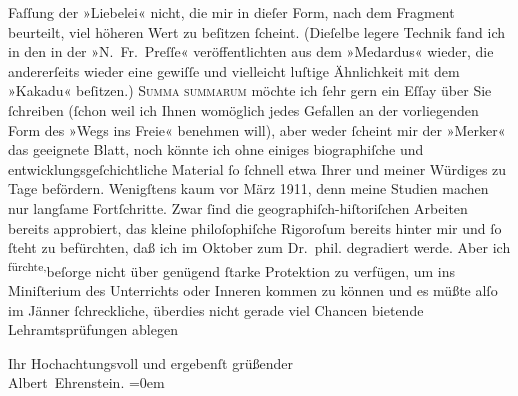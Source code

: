                Faſſung der »Liebelei« nicht, die mir in dieſer
               Form, nach dem Fragment beurteilt, viel höheren Wert zu beſitzen ſcheint. (Dieſelbe
               legere Technik fand ich in den in der »N. Fr. Preſſe« veröffentlichten \label{K_L01946-6v}\label{K_L01946-6} aus dem »Medardus« wieder, die andererſeits wieder eine
               gewiſſe und vielleicht luſtige Ähnlichkeit mit dem »Kakadu« beſitzen.) \textsc{Summa summarum} möchte ich ſehr
               gern ein Eſſay über Sie ſchreiben (ſchon weil ich Ihnen womöglich jedes Gefallen an
               der vorliegenden Form des »Wegs ins Freie«
               benehmen will), aber weder ſcheint mir {\pb}der »Merker« das geeignete Blatt, noch könnte
               ich ohne einiges biographiſche und entwicklungsgeſchichtliche Material ſo ſchnell
               etwa Ihrer und meiner Würdiges zu Tage befördern. Wenigſtens kaum vor März
                  1911, denn meine Studien machen nur langſame Fortſchritte. Zwar ſind die
               geographiſch-hiſtoriſchen Arbeiten bereits approbiert, das kleine philoſophiſche
               Rigoroſum bereits hinter mir und ſo ſteht zu befürchten, daß ich im
                  Oktober zum Dr. phil. degradiert werde. Aber ich \substVorne{}\textsuperscript{fürchte,}\substDazwischen{}beſorge\substHinten{} nicht über genügend ſtarke Protektion zu verfügen, um ins Miniſterium des Unterrichts oder Inneren kommen zu können und es müßte alſo im
                  Jänner{ }ſchreckliche, überdies nicht gerade viel Chancen
               bietende Lehramtsprüfungen ablegen\pend
           
\pstart
           Ihr Hochachtungsvoll und ergebenſt grüßender{\\[\baselineskip]}\spacefill\mbox{Albert Ehrenstein.}\pend
           \leftskip=0em{}\endnumbering{}  
      